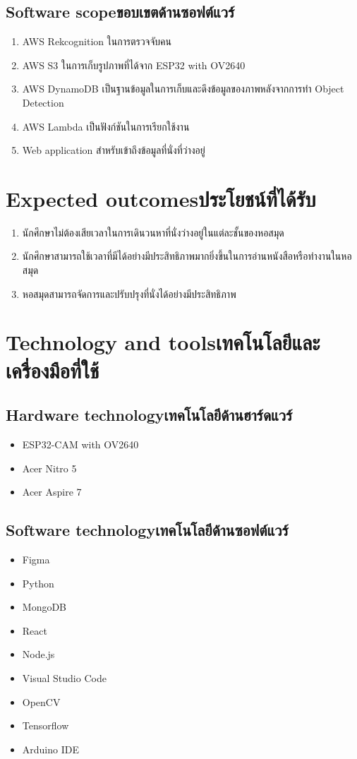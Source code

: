 \subsection{\ifenglish Software scope\else ขอบเขตด้านซอฟต์แวร์\fi}
\begin{enumerate}
    \item AWS Rekcognition ในการตรวจจับคน
    \item AWS S3 ในการเก็บรูปภาพที่ได้จาก ESP32 with OV2640
    \item AWS DynamoDB เป็นฐานข้อมูลในการเก็บและดึงข้อมูลของภาพหลังจากการทำ Object Detection
    \item AWS Lambda เป็นฟังก์ชันในการเรียกใช้งาน
    \item Web application สำหรับเข้าถึงข้อมูลที่นั่งที่ว่างอยู่
\end{enumerate}

\section{\ifenglish Expected outcomes\else ประโยชน์ที่ได้รับ\fi}
\begin{enumerate}
   \item นักศึกษาไม่ต้องเสียเวลาในการเดินวนหาที่นั่งว่างอยู่ในแต่ละชั้นของหอสมุด
   \item นักศึกษาสามารถใช้เวลาที่มีได้อย่างมีประสิทธิภาพมากยิ่งขึ้นในการอ่านหนังสือหรือทำงานในหอสมุด
   \item หอสมุดสามารถจัดการและปรับปรุงที่นั่งได้อย่างมีประสิทธิภาพ 
\end{enumerate}
\section{\ifenglish Technology and tools\else เทคโนโลยีและเครื่องมือที่ใช้\fi}

\subsection{\ifenglish Hardware technology\else เทคโนโลยีด้านฮาร์ดแวร์\fi}
\begin{itemize}
    \item ESP32-CAM with OV2640
    \item Acer Nitro 5
    \item Acer Aspire 7
\end{itemize}
\subsection{\ifenglish Software technology\else เทคโนโลยีด้านซอฟต์แวร์\fi}
\begin{itemize}
    \item Figma
    \item Python
    \item MongoDB
    \item React
    \item Node.js
    \item Visual Studio Code
    \item OpenCV
    \item Tensorflow
    \item Arduino IDE    
\end{itemize}
